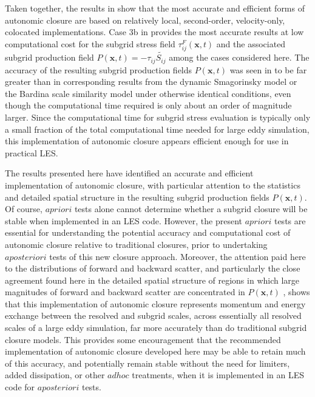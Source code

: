 Taken together, the results in  show that the most accurate and efficient forms of autonomic closure are based on relatively local, second-order, velocity-only, colocated implementations. Case 3b in  provides the most accurate results at low computational cost for the subgrid stress field $\tau_{ij}^F(\mathbf{x},t)$  and the associated subgrid production field $P(\mathbf{x},t) = -\tau_{ij}\widetilde{S_{ij}}$  among the cases considered here. The accuracy of the resulting subgrid production fields  $P(\mathbf{x},t)$ was seen in  to be far greater than in corresponding results from the dynamic Smagorinsky model or the Bardina scale similarity model under otherwise identical conditions, even though the computational time required is only about an order of magnitude larger. Since the computational time for subgrid stress evaluation is typically only a small fraction of the total computational time needed for large eddy simulation, this implementation of autonomic closure appears efficient enough for use in practical LES.

The results presented here have identified an accurate and efficient implementation of autonomic closure, with particular attention to the statistics and detailed spatial structure in the resulting subgrid production fields $P(\mathbf{x},t)$. Of course, $a priori$ tests alone cannot determine whether a subgrid closure will be stable when implemented in an LES code. However, the present $a priori$ tests are essential for understanding the potential accuracy and computational cost of autonomic closure relative to traditional closures, prior to undertaking $a posteriori$ tests of this new closure approach. Moreover, the attention paid here to the distributions of forward and backward scatter, and particularly the close agreement found here in the detailed spatial structure of regions in which large magnitudes of forward and backward scatter are concentrated in $P(\mathbf{x},t)$ , shows that this implementation of autonomic closure represents momentum and energy exchange between the resolved and subgrid scales, across essentially all resolved scales of a large eddy simulation, far more accurately than do traditional subgrid closure models. This provides some encouragement that the recommended implementation of autonomic closure developed here may be able to retain much of this accuracy, and potentially remain stable without the need for limiters, added dissipation, or other $ad hoc$ treatments, when it is implemented in an LES code for $a posteriori$ tests.
